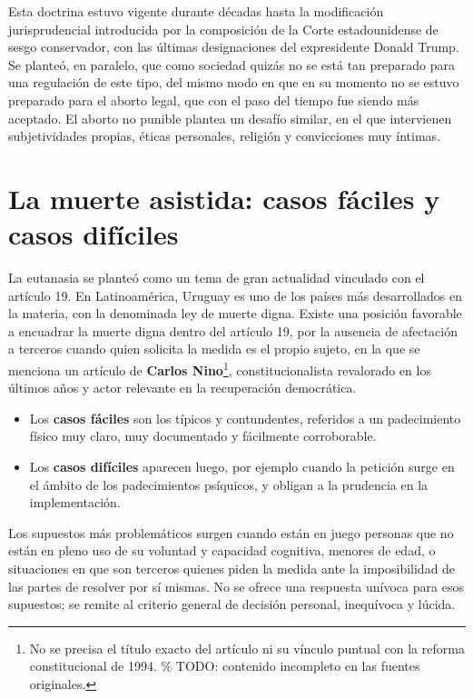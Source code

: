 \documentclass[12pt,oneside]{book}
\begin{document}
\begin{note}
Esta doctrina estuvo vigente durante décadas hasta la modificación jurisprudencial introducida por la composición de la Corte estadounidense de sesgo conservador, con las últimas designaciones del expresidente Donald Trump. Se planteó, en paralelo, que como sociedad quizás no se está tan preparado para una regulación de este tipo, del mismo modo en que en su momento no se estuvo preparado para el aborto legal, que con el paso del tiempo fue siendo más aceptado. El aborto no punible plantea un desafío similar, en el que intervienen subjetividades propias, éticas personales, religión y convicciones muy íntimas.
\end{note}

\section{La muerte asistida: casos fáciles y casos difíciles}

La eutanasia se planteó como un tema de gran actualidad vinculado con el artículo 19. En Latinoamérica, Uruguay es uno de los países más desarrollados en la materia, con la denominada ley de muerte digna. Existe una posición favorable a encuadrar la muerte digna dentro del artículo 19, por la ausencia de afectación a terceros cuando quien solicita la medida es el propio sujeto, en la que se menciona un artículo de \textbf{Carlos Nino}\footnote{No se precisa el título exacto del artículo ni su vínculo puntual con la reforma constitucional de 1994. \% TODO: contenido incompleto en las fuentes originales.}, constitucionalista revalorado en los últimos años y actor relevante en la recuperación democrática.

\begin{itemize}
    \item Los \textbf{casos fáciles} son los típicos y contundentes, referidos a un padecimiento físico muy claro, muy documentado y fácilmente corroborable.
    \item Los \textbf{casos difíciles} aparecen luego, por ejemplo cuando la petición surge en el ámbito de los padecimientos psíquicos, y obligan a la prudencia en la implementación.
\end{itemize}

\begin{important}
Los supuestos más problemáticos surgen cuando están en juego personas que no están en pleno uso de su voluntad y capacidad cognitiva, menores de edad, o situaciones en que son terceros quienes piden la medida ante la imposibilidad de las partes de resolver por sí mismas. No se ofrece una respuesta unívoca para esos supuestos; se remite al criterio general de decisión personal, inequívoca y lúcida.
\end{important}
\end{document}
